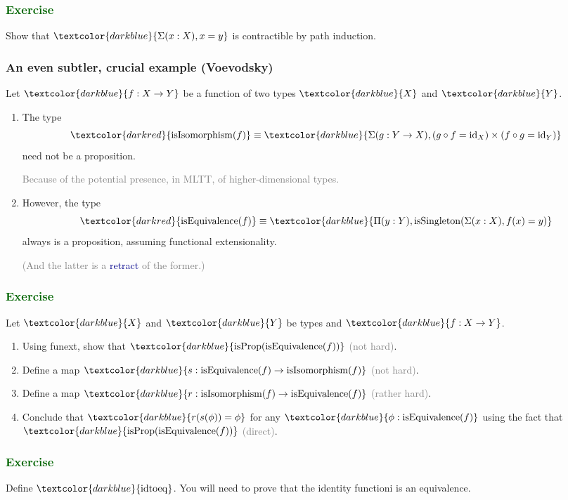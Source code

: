 \documentclass[aspectratio=169]{beamer}
\newcommand{\isProp}{\operatorname{isProp}}
\newcommand{\isSingleton}{\operatorname{isSingleton}}
\newcommand{\isEquivalence}{\operatorname{isEquivalence}}
\newcommand{\isIsomorphism}{\operatorname{isIsomorphism}}
\newcommand{\idtoeq}{\operatorname{idtoeq}}
\newcommand{\eqq}{\equiv}
\newcommand{\db}{\textcolor{darkblue}}
\newcommand{\dg}{\textcolor{darkgreen}}
\newcommand{\grey}{\textcolor{grey}}
\newcommand{\dr}{\textcolor{darkred}}
\newcommand{\m}[1]{$\db{#1}$}
\newcommand{\id}{\operatorname{id}}
\begin{document}
\begin{frame}\frametitle{\dg{Exercise}}

Show that \m{\Sigma(x:X), x = y} is contractible by path induction.

\end{frame}

\begin{frame}
  \frametitle{An even subtler, crucial example (Voevodsky)}

Let \m{f:X \to Y} be a function of two types \m{X} and \m{Y}.
  \begin{enumerate}
  \vfill \item The type \[\dr{\isIsomorphism(f)} \eqq \db{\Sigma(g:Y \to X),  (g \circ f = \id_X) \times (f \circ g = \id_Y)}\] need not be a proposition.

\vfill

\grey{Because of the potential presence, in MLTT, of higher-dimensional types.}

\vfill \item However, the type 
\[
\dr{\isEquivalence(f)} \eqq \db{\Pi(y:Y), \isSingleton(\Sigma(x:X), f(x)=y)}
\]
always is a proposition, assuming functional extensionality.

\vfill \grey{(And the latter is a \db{retract} of the former.)}
  \end{enumerate}

\end{frame}

\begin{frame}
  \frametitle{\dg{Exercise}}

Let \m{X} and \m{Y} be types and \m{f:X \to Y}.
 \begin{enumerate}
  \item Using funext, show that \m{\isProp(\isEquivalence(f))} \grey{(not hard)}.
  \item Define a map \m{s : \isEquivalence(f) \to \isIsomorphism(f)} \grey{(not hard)}.
  \item Define a map \m{r : \isIsomorphism(f) \to \isEquivalence(f)} \grey{(rather hard)}.
   \item Conclude that \m{r(s(\phi)) = \phi} for any \m{\phi :
   \isEquivalence(f)} using the fact that \m{\isProp(\isEquivalence(f))} \grey{(direct)}.
  \end{enumerate}
  
\end{frame}

\begin{frame}
  \frametitle{\dg{Exercise}}

  Define \m{\idtoeq}. You will need to prove that the identity functioni is an equivalence.
  
\end{frame}
\end{document}
